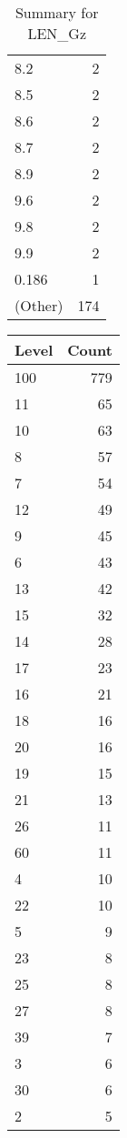 \begin{table}[ht]
\begin{tabular}{lr}
  8.2 &   2 \\ 
  8.5 &   2 \\ 
  8.6 &   2 \\ 
  8.7 &   2 \\ 
  8.9 &   2 \\ 
  9.6 &   2 \\ 
  9.8 &   2 \\ 
  9.9 &   2 \\ 
  0.186 &   1 \\ 
  (Other) & 174 \\ 
   \hline
\end{tabular}
\caption{Summary for LEN_Gz} 
\label{tab: LEN_Gz}
\end{table}
\begin{table}[ht]
\centering
\begin{tabular}{lr}
  \hline
Level & Count \\ 
  \hline
100 & 779 \\ 
  11 &  65 \\ 
  10 &  63 \\ 
  8 &  57 \\ 
  7 &  54 \\ 
  12 &  49 \\ 
  9 &  45 \\ 
  6 &  43 \\ 
  13 &  42 \\ 
  15 &  32 \\ 
  14 &  28 \\ 
  17 &  23 \\ 
  16 &  21 \\ 
  18 &  16 \\ 
  20 &  16 \\ 
  19 &  15 \\ 
  21 &  13 \\ 
  26 &  11 \\ 
  60 &  11 \\ 
  4 &  10 \\ 
  22 &  10 \\ 
  5 &   9 \\ 
  23 &   8 \\ 
  25 &   8 \\ 
  27 &   8 \\ 
  39 &   7 \\ 
  3 &   6 \\ 
  30 &   6 \\ 
  2 &   5 \\ 

\end{tabular}
\end{table}
